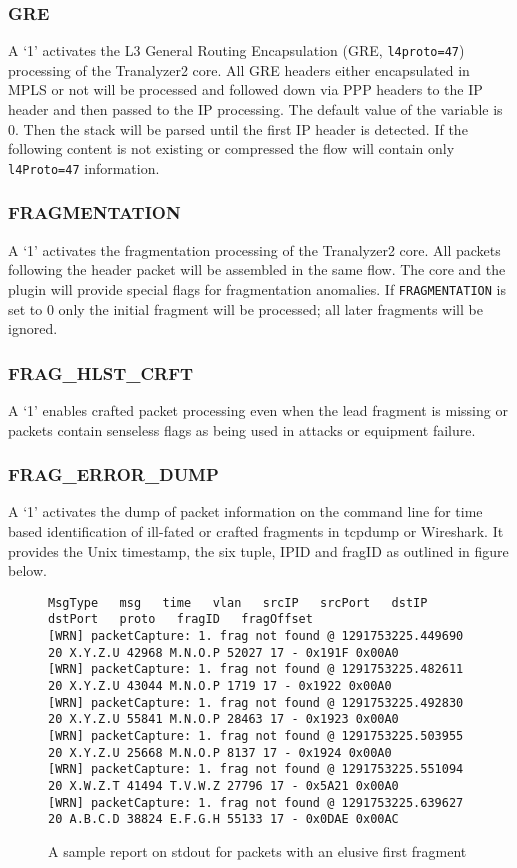 \subsubsection{GRE}
A `1' activates the L3 General Routing Encapsulation (GRE, {\tt l4proto=47}) processing of the Tranalyzer2 core. All GRE headers either encapsulated in MPLS or not will be processed and followed down via PPP headers to the IP header and then passed to the IP processing. The default value of the variable is 0. Then the stack will be parsed until the first IP header is detected. If the following content is not existing or compressed the flow will contain only {\tt l4Proto=47} information.

\subsubsection{FRAGMENTATION}
A `1' activates the fragmentation processing of the Tranalyzer2 core. All packets following the header packet will be assembled in the same flow. The core and the plugin  will provide special flags for fragmentation anomalies. If {\tt FRAGMENTATION} is set to 0 only the initial fragment will be processed; all later fragments will be ignored.

\subsubsection{FRAG\_HLST\_CRFT}
A `1' enables crafted packet processing even when the lead fragment is missing or packets contain senseless flags as being used in attacks or equipment failure.

\subsubsection{FRAG\_ERROR\_DUMP}
A `1' activates the dump of packet information on the command line for time based identification of ill-fated or crafted fragments in tcpdump or Wireshark. It provides the Unix timestamp, the six tuple, IPID and fragID as outlined in figure below.

\begin{figure}[!ht]
\begin{lstlisting}
MsgType   msg   time   vlan   srcIP   srcPort   dstIP   dstPort   proto   fragID   fragOffset
[WRN] packetCapture: 1. frag not found @ 1291753225.449690 20 X.Y.Z.U 42968 M.N.O.P 52027 17 - 0x191F 0x00A0
[WRN] packetCapture: 1. frag not found @ 1291753225.482611 20 X.Y.Z.U 43044 M.N.O.P 1719 17 - 0x1922 0x00A0
[WRN] packetCapture: 1. frag not found @ 1291753225.492830 20 X.Y.Z.U 55841 M.N.O.P 28463 17 - 0x1923 0x00A0
[WRN] packetCapture: 1. frag not found @ 1291753225.503955 20 X.Y.Z.U 25668 M.N.O.P 8137 17 - 0x1924 0x00A0
[WRN] packetCapture: 1. frag not found @ 1291753225.551094 20 X.W.Z.T 41494 T.V.W.Z 27796 17 - 0x5A21 0x00A0
[WRN] packetCapture: 1. frag not found @ 1291753225.639627 20 A.B.C.D 38824 E.F.G.H 55133 17 - 0x0DAE 0x00AC
\end{lstlisting}
\caption{A sample report on stdout for packets with an elusive first fragment}
\end{figure}

